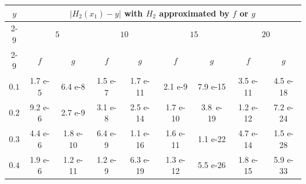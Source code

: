 \documentclass{article}
\begin{document}
\begin{table}[t!]
	\centering 
	

	\begin{tabular}{|c|cccccccc|}
		\hline
		\multirow{3}{*}{$y$} & \multicolumn{8}{c|}{$|H_{2}(x_{1})-y|$ with $H_{2}$ approximated by $f$ or $g$}                                                                                                                                                                                                                                 \\ \cline{2-9} 
		& \multicolumn{2}{c|}{$5$}                                             & \multicolumn{2}{c|}{$10$}                                             & \multicolumn{2}{c|}{$15$}                                             & \multicolumn{2}{c|}{$20$}                        \\ \cline{2-9} 
		& \multicolumn{1}{c|}{$f$}         & \multicolumn{1}{c|}{$g$}          & \multicolumn{1}{c|}{$f$}          & \multicolumn{1}{c|}{$g$}          & \multicolumn{1}{c|}{$f$}          & \multicolumn{1}{c|}{$g$}          & \multicolumn{1}{c|}{$f$}          & $g$          \\ \hline
		$0.1$                & \multicolumn{1}{c|}{\small{1.7 e-5}}  & \multicolumn{1}{c|}{\small{6.4 e-8}}  & \multicolumn{1}{c|}{\small{1.5 e-7}}  & \multicolumn{1}{c|}{\small{1.7 e-11}} & \multicolumn{1}{c|}{\small{2.1 e-9}}  & \multicolumn{1}{c|}{\small{7.9 e-15}} & \multicolumn{1}{c|}{\small{3.5 e-11}} & \small{4.5 e-18} \\ \hline
		$0.2$                & \multicolumn{1}{c|}{\small{9.2 e-6}} & \multicolumn{1}{c|}{\small{2.7 e-9}}  & \multicolumn{1}{c|}{\small{3.1 e-8}}  & \multicolumn{1}{c|}{\small{2.5 e-14}} & \multicolumn{1}{c|}{\small{1.7 e-10}} & \multicolumn{1}{c|}{\small{3.8\ e-19}} & \multicolumn{1}{c|}{\small{1.2 e-12}} & \small{7.2 e-24} \\ \hline
		$0.3$                & \multicolumn{1}{c|}{\small{4.4 e-6}} & \multicolumn{1}{c|}{\small{1.8 e-10}} & \multicolumn{1}{c|}{\small{6.4 e-9}}  & \multicolumn{1}{c|}{\small{1.1 e-16}} & \multicolumn{1}{c|}{\small{1.6 e-11}} & \multicolumn{1}{c|}{\small{1.1 e-22}} & \multicolumn{1}{c|}{\small{4.7 e-14}} & \small{1.5 e-28} \\ \hline
		$0.4$                & \multicolumn{1}{c|}{\small{1.9 e-6}} & \multicolumn{1}{c|}{\small{1.2 e-11}} & \multicolumn{1}{c|}{\small{1.2 e-9}}  & \multicolumn{1}{c|}{\small{6.3 e-19}} & \multicolumn{1}{c|}{\small{1.3 e-12}} & \multicolumn{1}{c|}{\small{5.5 e-26}} & \multicolumn{1}{c|}{\small{1.8 e-15}} & \small{5.9 e-33} \\ \hline

\end{tabular}
\end{table}
\end{document}
